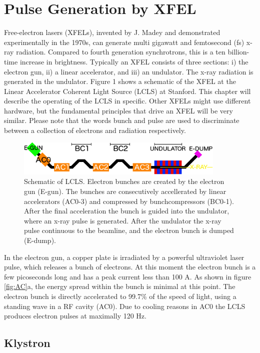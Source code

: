 \chapter{Pulse Generation by XFEL}
Free-electron lasers (XFELs), invented by J. Madey and demonstrated experimentally in the 1970s, can generate multi gigawatt and femtosecond (fs) x-ray radiation. Compared to fourth generation synchrotrons, this is a ten billion-time increase in brightness. Typically an XFEL consists of three sections: i) the electron gun, ii) a linear accelerator, and iii) an undulator. The x-ray radiation is generated in the undulator. Figure 1 shows a schematic of the XFEL at the Linear Accelerator Coherent Light Source (LCLS) at Stanford. This chapter will describe the operating of the LCLS in specific. Other XFELs might use different hardware, but the fundamental principles that drive an XFEL will be very similar. Please note that the words bunch and pulse are used to discriminate between a collection of electrons and radiation respectively.

\begin{figure}[h]\label{fig:LCLS}
\centering
\includegraphics[width=100mm]{Chapter_03_LCLSSchematic.png}
\caption{Schematic of LCLS. Electron bunches are created by the electron gun (E-gun). The bunches are consecutively accellerated by linear accelerators (AC0-3) and compressed by bunchcompressors (BC0-1). After the final acceleration the bunch is guided into the undulator, where an x-ray pulse is generated. After the undulator the x-ray pulse continuous to the beamline, and the electron bunch is dumped (E-dump).}
\end{figure}

In the electron gun, a copper plate is irradiated by a powerful ultraviolet laser pulse, which releases a bunch of electrons. At this moment the electron bunch is a few picoseconds long and has a peak current less than 100 A. As shown in figure \ref{fig:AC}a, the energy spread within the bunch is minimal at this point. The electron bunch is directly accelerated to 99.7\% of the speed of light, using a standing wave in a RF cavity (AC0). Due to cooling reasons in AC0 the LCLS produces electron pulses at maximally 120 Hz. 

\section{Klystron}

